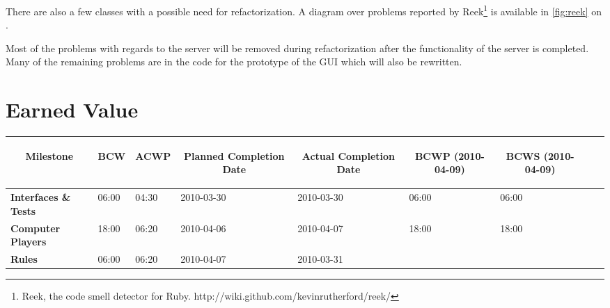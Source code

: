 \documentclass[10pt, titlepage, oneside, a4paper]{article}
\begin{document}
		There are also a few classes with a possible need for refactorization. A diagram over problems reported by Reek\footnote{Reek, the code smell detector for Ruby. http://wiki.github.com/kevinrutherford/reek/} is available in \figurename{} \ref{fig:reek} on \pagename{} \pageref{fig:reek}.
		
		Most of the problems with regards to the server will be removed during refactorization after the functionality of the server is completed. Many of the remaining problems are in the code for the prototype of the GUI which will also be rewritten.
	
	\section{Earned Value}
	\begin{table}[t!]
	\vspace{30mm}	
	\centering
	\begin{tabular}{*{9}{l}}
	    \multicolumn{1}{c}{\begin{rotate}{45}\textbf{Milestone}\end{rotate}} &
		 \multicolumn{1}{c}{\begin{rotate}{45}\textbf{BCW}\end{rotate}} & 
		 \multicolumn{1}{c}{\begin{rotate}{45}\textbf{ACWP}\end{rotate}} &
		 \multicolumn{1}{c}{\begin{rotate}{45}\textbf{Planned Completion Date}\end{rotate}} &
		 \multicolumn{1}{c}{\begin{rotate}{45}\textbf{Actual Completion Date}\end{rotate}}  &
		 \multicolumn{1}{c}{\begin{rotate}{45}\textbf{BCWP (2010-04-09)}\end{rotate}} &
		 \multicolumn{1}{c}{\begin{rotate}{45}\textbf{BCWS (2010-04-09)}\end{rotate}} \\
	    \hline
	    \textbf{Interfaces \& Tests}		 & 06:00  			 & 04:30	 	 
											 & 2010-03-30		 & 2010-03-30
											 & 06:00			 & 06:00  \\
	    \textbf{Computer Players}            & 18:00 	  		 & 06:20		 
											 & 2010-04-06		 & 2010-04-07
  											 & 18:00 			 & 18:00 \\
	    \textbf{Rules}       				 & 06:00   			 & 06:20		 
											 & 2010-04-07		 & 2010-03-31

\end{tabular}
\end{table}
\end{document}
